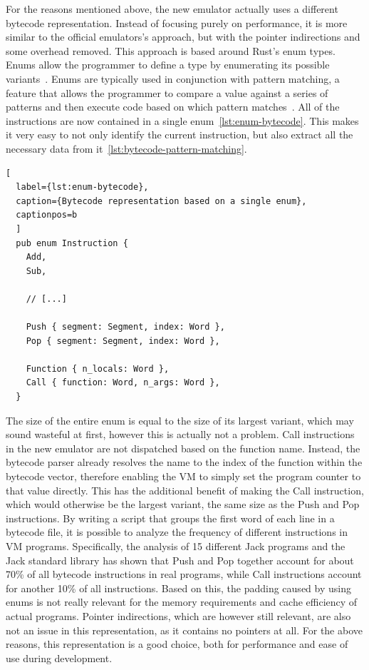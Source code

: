 For the reasons mentioned above, the new emulator actually uses a different bytecode representation. Instead of focusing purely on performance, it is more similar to the official emulators's approach, but with the pointer indirections and some overhead removed.
This approach is based around Rust's enum types. Enums allow the programmer to define a type by enumerating its possible variants~\cite[Chapter~6]{klabnik2019rust}.
Enums are typically used in conjunction with pattern matching, a feature that allows the programmer to compare a value against a series of patterns and then execute code based on which pattern matches~\cite[Chapter~6.2]{klabnik2019rust}.
All of the instructions are now contained in a single enum~\ref{lst:enum-bytecode}.
This makes it very easy to not only identify the current instruction, but also extract all the necessary data from it~\ref{lst:bytecode-pattern-matching}.

\begin{lstlisting}[
  label={lst:enum-bytecode},
  caption={Bytecode representation based on a single enum},
  captionpos=b
  ]
  pub enum Instruction {
    Add,
    Sub,

    // [...]

    Push { segment: Segment, index: Word },
    Pop { segment: Segment, index: Word },

    Function { n_locals: Word },
    Call { function: Word, n_args: Word },
  }
\end{lstlisting}

\label{call-instruction}
The size of the entire enum is equal to the size of its largest variant, which may sound wasteful at first, however this is actually not a problem.
Call instructions in the new emulator are not dispatched based on the function name. Instead, the bytecode parser already resolves the name to the index of the function within the bytecode vector, therefore enabling the VM to simply set the program counter to that value directly.
This has the additional benefit of making the Call instruction, which would otherwise be the largest variant, the same size as the Push and Pop instructions.
By writing a script that groups the first word of each line in a bytecode file, it is possible to analyze the frequency of different instructions in VM programs.
Specifically, the analysis of 15 different Jack programs and the Jack standard library has shown that Push and Pop together account for about 70\% of all bytecode instructions in real programs, while Call instructions account for another 10\% of all instructions.
Based on this, the padding caused by using enums is not really relevant for the memory requirements and cache efficiency of actual programs.
Pointer indirections, which are however still relevant, are also not an issue in this representation, as it contains no pointers at all.
For the above reasons, this representation is a good choice, both for performance and ease of use during development.

